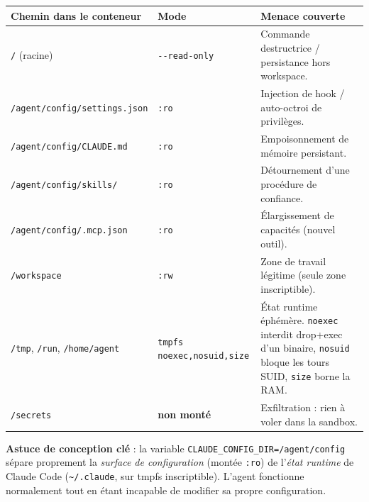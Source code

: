 \documentclass[11pt,a4paper]{article}
\begin{document}
\renewcommand{\arraystretch}{1.3}
\begin{longtable}{@{}p{5.6cm}p{2.2cm}p{6.4cm}@{}}
\toprule
\textbf{Chemin dans le conteneur} & \textbf{Mode} & \textbf{Menace couverte} \\ \midrule
\rowcolor{rwc}\texttt{/} (racine) & \texttt{-{}-read-only} & Commande destructrice / persistance hors workspace. \\
\rowcolor{roc}\texttt{/agent/config/settings.json} & \texttt{:ro} & Injection de hook / auto-octroi de privilèges. \\
\rowcolor{roc}\texttt{/agent/config/CLAUDE.md} & \texttt{:ro} & Empoisonnement de mémoire persistant. \\
\rowcolor{roc}\texttt{/agent/config/skills/} & \texttt{:ro} & Détournement d'une procédure de confiance. \\
\rowcolor{roc}\texttt{/agent/config/.mcp.json} & \texttt{:ro} & Élargissement de capacités (nouvel outil). \\
\rowcolor{rwc}\texttt{/workspace} & \texttt{:rw} & Zone de travail légitime (seule zone inscriptible). \\
\rowcolor{tmpc}\texttt{/tmp}, \texttt{/run}, \texttt{/home/agent} & \texttt{tmpfs} \texttt{noexec,nosuid,size} & État runtime éphémère. \texttt{noexec} interdit drop+exec d'un binaire, \texttt{nosuid} bloque les tours SUID, \texttt{size} borne la RAM. \\
\rowcolor{white}\texttt{/secrets} & \textbf{non monté} & Exfiltration : rien à voler dans la sandbox. \\ \bottomrule
\end{longtable}

\noindent\textbf{Astuce de conception clé} : la variable \texttt{CLAUDE\_CONFIG\_DIR=/agent/config}
sépare proprement la \emph{surface de configuration} (montée \texttt{:ro}) de l'\emph{état runtime} de
Claude Code (\texttt{\textasciitilde/.claude}, sur tmpfs inscriptible). L'agent fonctionne normalement
tout en étant incapable de modifier sa propre configuration.

\newpage
\end{document}
